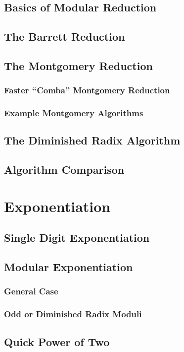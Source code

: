 \documentclass[b5paper]{book}
\begin{document}
\section{Basics of Modular Reduction}
\section{The Barrett Reduction}
\section{The Montgomery Reduction}
\subsection{Faster ``Comba'' Montgomery Reduction}
\subsection{Example Montgomery Algorithms}
\section{The Diminished Radix Algorithm}
\section{Algorithm Comparison}

\chapter{Exponentiation}
\section{Single Digit Exponentiation}
\section{Modular Exponentiation}
\subsection{General Case}
\subsection{Odd or Diminished Radix Moduli}
\section{Quick Power of Two}
\end{document}

